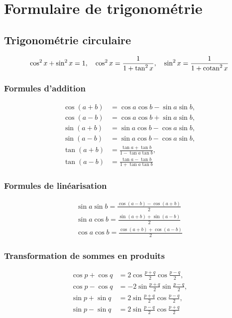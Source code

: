 \chapter{Formulaire de trigonométrie}

\section{Trigonométrie circulaire}

\begin{equation}
  \cos^2x+\sin^2x = 1, \quad \cos^2x=\frac{1}{1+\tan^2x}, \quad \sin^2x=\frac{1}{1+\operatorname{cotan}^2x}
\end{equation}

\subsection{Formules d'addition}

\begin{align}
  \cos(a+b)&=\cos a \cos b -\sin a \sin b, \\   \cos(a-b)&=\cos a \cos b +\sin a \sin b, \\
  \sin(a+b)&=\sin a \cos b -\cos a \sin b, \\  \sin(a-b)&=\sin a \cos b -\cos a \sin b, \\
  \tan(a+b)&=\frac{\tan a+ \tan b}{1-\tan a \tan b}, \\   \tan(a-b)&=\frac{\tan a - \tan b}{1+\tan a \tan b}
\end{align}

\subsection{Formules de linéarisation}

\begin{align}
  \sin a \sin b = \frac{\cos(a-b)-\cos(a+b)}{2} \\
  \sin a \cos b = \frac{\sin(a+b)+\sin(a-b)}{2} \\
  \cos a \cos b = \frac{\cos(a+b)+\cos(a-b)}{2} 
\end{align}

\subsection{Transformation de sommes en produits}

\begin{align}
  \cos p + \cos q &= 2 \cos \frac{p+q}{2} \cos \frac{p-q}{2}, \\ \cos p - \cos q &= -2 \sin \frac{p+q}{2} \sin \frac{p-q}{2},\\
  \sin p + \sin q &= 2 \sin \frac{p+q}{2} \cos \frac{p-q}{2}, \\ \sin p - \sin q &= 2 \sin \frac{p-q}{2} \cos \frac{p+q}{2}
\end{align}

